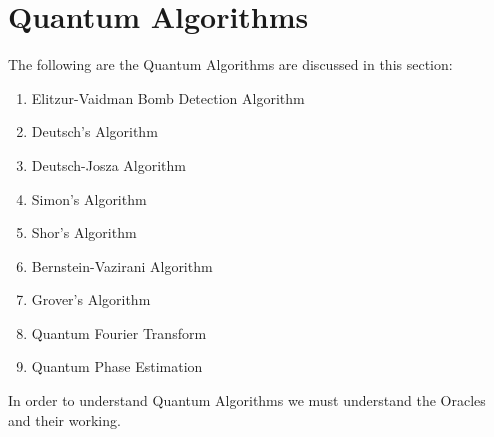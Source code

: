 \documentclass[12pt, oneside]{book}
\theoremstyle{definition}
\theoremstyle{definition}
\theoremstyle{remark}
\begin{document}
\chapter{Quantum Algorithms}
The following are the Quantum Algorithms are discussed in this section:
\begin{enumerate}
    \item Elitzur-Vaidman Bomb Detection Algorithm
    \item Deutsch's Algorithm
    \item Deutsch-Josza Algorithm
    \item Simon's Algorithm
    \item Shor's Algorithm
    \item Bernstein-Vazirani Algorithm
    \item Grover's Algorithm
    \item Quantum Fourier Transform
    \item Quantum Phase Estimation
\end{enumerate}
In order to understand Quantum Algorithms we must understand the Oracles and their working.
\end{document}
